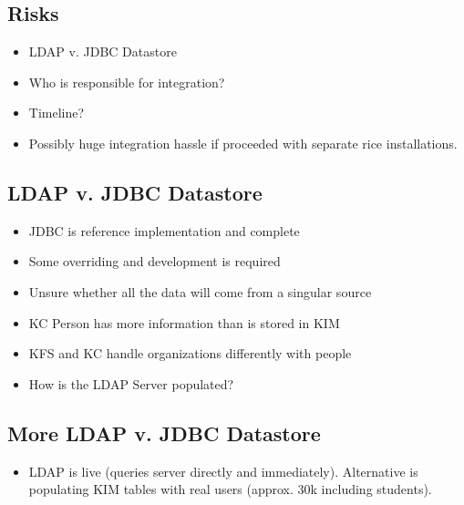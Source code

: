 \documentclass[12pt,notitlepage]{article}
\begin{document}
\begin{s5presentation}
\begin{s5slide}
    \section{Risks}
    \begin{itemize}
      \item LDAP v. JDBC Datastore
      \item Who is responsible for integration?
      \item Timeline?
      \item Possibly huge integration hassle if proceeded with separate rice
        installations.
    \end{itemize}
  \W \end{s5slide}

%
%
  \W \begin{s5slide}
    \section{LDAP v. JDBC Datastore}
    \begin{itemize}
      \item JDBC is reference implementation and complete
      \item Some overriding and development is required
      \item Unsure whether all the data will come from a singular source
      \item KC Person has more information than is stored in KIM
      \item KFS and KC handle organizations differently with people
      \item How is the LDAP Server populated?
    \end{itemize}
  \W \end{s5slide}

%
%
  \W \begin{s5slide}
    \section{More LDAP v. JDBC Datastore}
    \begin{itemize}
      \item LDAP is live (queries server directly and immediately). Alternative
        is populating KIM tables with real users (approx. 30k including students).
    \end{itemize}
  \W \end{s5slide}


\end{s5presentation}
\end{document}
